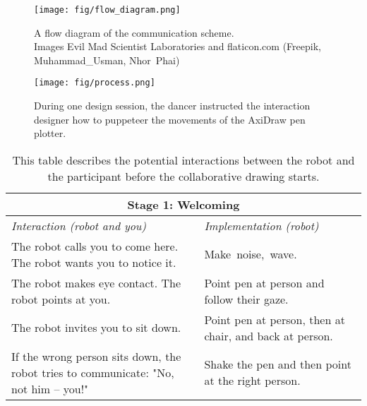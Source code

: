 \documentclass[sigconf,anonymous=false]{acmart}
\begin{document}
\begin{figure}%
\centerline{\texttt{[image: fig/flow\_diagram.png]}}
\vspace{-.1in}
\caption{A flow diagram of the communication scheme. \\Images \textcopyright Evil Mad Scientist Laboratories and flaticon.com (Freepik, Muhammad\_Usman, Nhor~Phai)}
\label{fig:diagram}

\end{figure}

\begin{figure}%
\vspace{-.1in}
\centerline{\texttt{[image: fig/process.png]}}
\vspace{-.1in}
\caption{During one design session, the dancer instructed the interaction designer how to puppeteer the movements of the AxiDraw pen plotter.}
\label{fig:process}
\vspace{-.2in}

\end{figure}



\begin{table}%
    \centering
\begin{tabular}{ || m{13em} | m{12em} || } 
\hline
\multicolumn{2}{|c|}{\textbf{Stage 1: Welcoming}} \\
\hline
 \textit{Interaction (robot and you)} & \textit{Implementation (robot)} \\ 
  \hline
  The robot calls you to come here.
  The robot wants you to notice it. & Make~noise,~wave. \\ 
  \hline
  The robot makes eye contact. 
  The robot points at you. & Point pen at person and follow their gaze. \\ 
  \hline
 The robot invites you to sit down. & Point pen at person, then at chair, and back at person. \\ 
 \hline
   If the wrong person sits down, the robot tries to communicate: "No, not him -- you!"  & Shake the pen and then point at the right person. \\ 
  \hline
\end{tabular}
\caption{This table describes the potential interactions between the robot and the participant before the collaborative drawing starts.}
\label{tab:welcoming}
\end{table}
\end{document}
